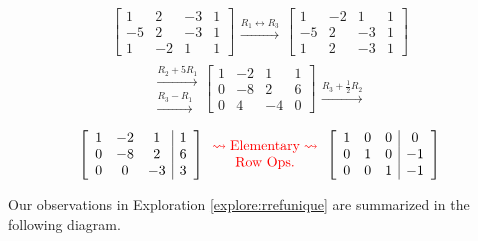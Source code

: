 \documentclass{ximera}
\begin{document}
\begin{exploration}
$$\left[\begin{array}{ccc|c}  
 1&2&-3&1\\-5&2&-3&1\\1&-2&1&1
 \end{array}\right]
 \begin{array}{c}
 \\
 \xrightarrow{R_1\leftrightarrow R_3}\\
\\
 \end{array}
\left[\begin{array}{ccc|c}  
 1&-2&1&1\\-5&2&-3&1\\1&2&-3&1
 \end{array}\right]$$
$$\begin{array}{c}
 \\
 \xrightarrow{R_2+5R_1}\\
 \xrightarrow{R_3-R_1}\\
 \end{array}
\left[\begin{array}{ccc|c}  
 1&-2&1&1\\0&-8&2&6\\0&4&-4&0
 \end{array}\right]
 \begin{array}{c}
 \\
 \\
 \xrightarrow{R_3+\frac{1}{2}R_2}\\
 \end{array}
$$
\begin{equation*}
  \left[\begin{array}{ccc|c}  
 1&-2&1&1\\0&-8&2&6\\0&0&-3&3
 \end{array}\right]
 \color{red}
 \begin{array}{c}
\rightsquigarrow\text{Elementary}\rightsquigarrow\\
\text{Row Ops.}
\end{array}
 \color{black}
  \left[\begin{array}{ccc|c}  
 1&0&0&0\\0&1&0&-1\\0&0&1&-1
 \end{array}\right]
\end{equation*}
\end{exploration}

Our observations in Exploration \ref{explore:rrefunique} are summarized in the following diagram.
\end{document}
